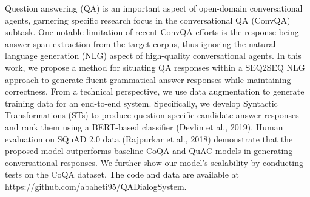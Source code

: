 Question answering (QA) is an important aspect of open-domain conversational agents, garnering specific research focus in the conversational QA (ConvQA) subtask. One notable limitation of recent ConvQA efforts is the response being answer span extraction from the target corpus, thus ignoring the natural language generation (NLG) aspect of high-quality conversational agents. In this work, we propose a method for situating QA responses within a SEQ2SEQ NLG approach to generate fluent grammatical answer responses while maintaining correctness. From a technical perspective, we use data augmentation to generate training data for an end-to-end system. Specifically, we develop Syntactic Transformations (STs) to produce question-specific candidate answer responses and rank them using a BERT-based classifier (Devlin et al., 2019). Human evaluation on SQuAD 2.0 data (Rajpurkar et al., 2018) demonstrate that the proposed model outperforms baseline CoQA and QuAC models in generating conversational responses. We further show our model's scalability by conducting tests on the CoQA dataset. The code and data are available at https://github.com/abaheti95/QADialogSystem.

